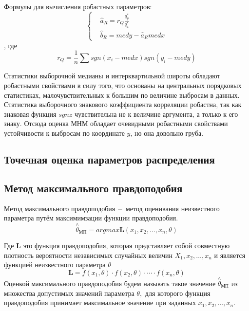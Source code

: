 \documentclass[a4]{article}
\begin{document}
Формулы для вычисления робастных параметров:
\begin{equation}
\begin{cases}
&  \hat{a}_{R} = r_{Q}\frac{q_{y}^{*}}{q_{x}^{*}} \\ 
&  \hat{b}_{R}= medy - \hat{a}_{R}medx
\end{cases}
\end{equation}, где 
\begin{equation}
r_{Q} = \frac{1}{n}\sum sgn(x_{i} - medx)sgn(y_{i} - medy)
\end{equation}

Статистики выборочной медианы и интерквартильной широты обладают
робастными свойствами в силу того, что основаны на центральных порядковых статистиках, малочувствительных к большим по величине выбросам
в данных. Статистика выборочного знакового коэффициента корреляции
робастна, так как знаковая функция $ sgn z $ чувствительна не к величине
аргумента, а только к его знаку. Отсюда оценка МНМ обладает очевидными робастными свойствами устойчивости к выбросам по
координате $ y $, но она довольно груба.

\subsection{Точечная оценка параметров распределения}
\subsection{Метод максимального правдоподобия}
Метод максимального правдоподобия $\--$ метод оценивания неизвестного параметра путём максимимзации функции правдоподобия.
\begin{equation}
\overset{\wedge}{\theta}_{\text{МП}}=argmax \mathbf{L}(x_1,x_2,\ldots,x_n,\theta)
\end{equation}

Где $\mathbf{L}$ это функция правдоподобия, которая представляет собой совместную плотность вероятности независимых случайных величин $X_1,x_2,\ldots,x_n$ и является функцией неизвестного параметра $\theta$
\begin{equation}
\mathbf{L} = f(x_1,\theta)\cdot f(x_2,\theta)\cdot\cdots\cdot f(x_n,\theta)
\end{equation}
Оценкой максимального правдоподобия будем называть такое значение $\overset{\wedge}{\theta}_{\text{МП}}$ из множества допустимых значений параметра $\theta,$ для которого функция правдоподобия принимает максимальное значение при заданных $x_1,x_2,\ldots,x_n.$
\end{document}

